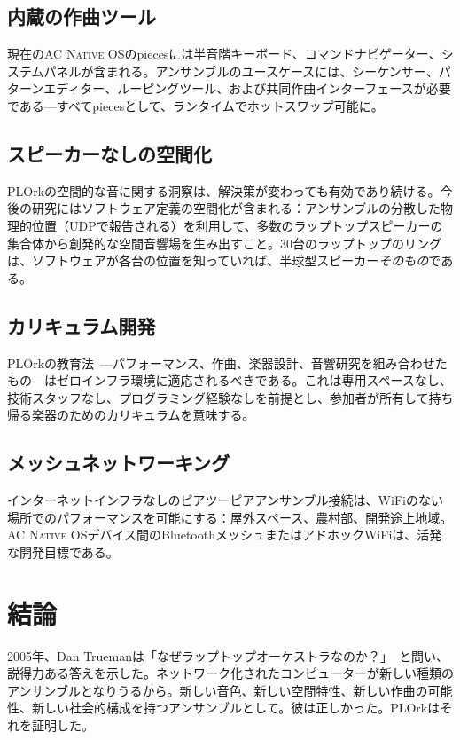 \documentclass[10pt,letterpaper,twocolumn]{article}
\newcommand{\acos}{\textsc{AC Native OS}}
\begin{document}
\subsection{内蔵の作曲ツール}

現在の\acos{}のpiecesには半音階キーボード、コマンドナビゲーター、システムパネルが含まれる。アンサンブルのユースケースには、シーケンサー、パターンエディター、ルーピングツール、および共同作曲インターフェースが必要である---すべてpiecesとして、ランタイムでホットスワップ可能に。

\subsection{スピーカーなしの空間化}

PLOrkの空間的な音に関する洞察は、解決策が変わっても有効であり続ける。今後の研究にはソフトウェア定義の空間化が含まれる：アンサンブルの分散した物理的位置（UDPで報告される）を利用して、多数のラップトップスピーカーの集合体から創発的な空間音響場を生み出すこと。30台のラップトップのリングは、ソフトウェアが各台の位置を知っていれば、半球型スピーカー\emph{そのもの}である。

\subsection{カリキュラム開発}

PLOrkの教育法~\citep{trueman2007why}---パフォーマンス、作曲、楽器設計、音響研究を組み合わせたもの---はゼロインフラ環境に適応されるべきである。これは専用スペースなし、技術スタッフなし、プログラミング経験なしを前提とし、参加者が所有して持ち帰る楽器のためのカリキュラムを意味する。

\subsection{メッシュネットワーキング}

インターネットインフラなしのピアツーピアアンサンブル接続は、WiFiのない場所でのパフォーマンスを可能にする：屋外スペース、農村部、開発途上地域。\acos{}デバイス間のBluetoothメッシュまたはアドホックWiFiは、活発な開発目標である。


\section{結論}

2005年、Dan Truemanは「なぜラップトップオーケストラなのか？」~\citep{trueman2007why}と問い、説得力ある答えを示した。ネットワーク化されたコンピューターが新しい種類のアンサンブルとなりうるから。新しい音色、新しい空間特性、新しい作曲の可能性、新しい社会的構成を持つアンサンブルとして。彼は正しかった。PLOrkはそれを証明した。
\end{document}
